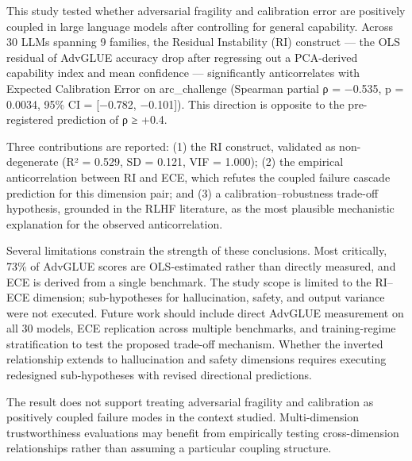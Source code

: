 
This study tested whether adversarial fragility and calibration error are positively coupled in large language models after controlling for general capability. Across 30 LLMs spanning 9 families, the Residual Instability (RI) construct — the OLS residual of AdvGLUE accuracy drop after regressing out a PCA-derived capability index and mean confidence — significantly anticorrelates with Expected Calibration Error on arc_challenge (Spearman partial ρ = −0.535, p = 0.0034, 95\% CI = [−0.782, −0.101]). This direction is opposite to the pre-registered prediction of ρ ≥ +0.4.

Three contributions are reported: (1) the RI construct, validated as non-degenerate (R² = 0.529, SD = 0.121, VIF = 1.000); (2) the empirical anticorrelation between RI and ECE, which refutes the coupled failure cascade prediction for this dimension pair; and (3) a calibration–robustness trade-off hypothesis, grounded in the RLHF literature, as the most plausible mechanistic explanation for the observed anticorrelation.

Several limitations constrain the strength of these conclusions. Most critically, 73\% of AdvGLUE scores are OLS-estimated rather than directly measured, and ECE is derived from a single benchmark. The study scope is limited to the RI–ECE dimension; sub-hypotheses for hallucination, safety, and output variance were not executed. Future work should include direct AdvGLUE measurement on all 30 models, ECE replication across multiple benchmarks, and training-regime stratification to test the proposed trade-off mechanism. Whether the inverted relationship extends to hallucination and safety dimensions requires executing redesigned sub-hypotheses with revised directional predictions.

The result does not support treating adversarial fragility and calibration as positively coupled failure modes in the context studied. Multi-dimension trustworthiness evaluations may benefit from empirically testing cross-dimension relationships rather than assuming a particular coupling structure.

